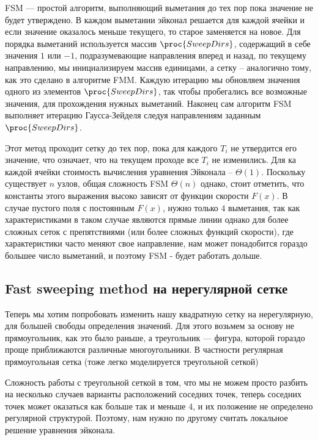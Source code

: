 FSM --- простой алгоритм, выполняющий выметания до тех пор пока
значение не будет утверждено. В каждом выметании эйконал решается для
каждой ячейки и если значение оказалось меньше текущего, то старое
заменяется на новое. Для порядка выметаний используется массив
$\proc{SweepDirs}$, содержащий в себе значения $1$ или $-1$,
подразумевающие направления вперед и назад, по текущему направлению,
мы инициализируем массив единицами, а сетку -- аналогично тому, как
это сделано в алгоритме FMM. Каждую итерацию мы обновляем значения
одного из элементов $\proc{SweepDirs}$, так чтобы пробегались все
возможные значения, для прохождения нужных выметаний. Наконец сам
алгоритм FSM выполняет итерацию Гаусса-Зейделя следуя направлениям
заданным $\proc{SweepDirs}$.

Этот метод проходит сетку до тех пор, пока для каждого $T_i$ не
утвердится его значение, что означает, что на текущем проходе все $T_i$ не
изменились. Для ка каждой ячейки стоимость вычисления уравнения
Эйконала -- $\Theta(1)$. Поскольку существует $n$ узлов, общая
сложность FSM $\Theta(n)$ однако, стоит отметить, что константы этого
выражения высоко зависят от функции скорости $F(x)$. В случае пустого
поля с постоянным $F(x)$, нужно только $4$ выметания, так как
характеристиками в таком случае являются прямые линии однако для более
сложных сеток с препятствиями (или более сложных функций скорости),
где характеристики часто меняют свое направление, нам может
понадобится гораздо большее число выметаний, и поэтому FSM - будет
работать дольше.

\subsection{Fast sweeping method на нерегулярной сетке}
\label{sec:unstructured-mesh}

Теперь мы хотим попробовать изменить нашу квадратную сетку на
нерегулярную, для большей свободы определения значений. Для этого
возьмем за основу не прямоугольник, как это было раньше, а треугольник
--- фигура, которой гораздо проще приближаются различные
многоугольники. В частности регулярная прямоугольная сетка (тоже легко
моделируется треугольной сеткой)

Сложность работы с треугольной сеткой в том, что мы не можем просто
разбить на несколько случаев варианты расположений соседних точек,
теперь соседних точек может оказаться как больше так и меньше $4$, и
их положение не определено регулярной структурой. Поэтому, нам нужно
по другому считать локальное решение уравнения эйконала.

